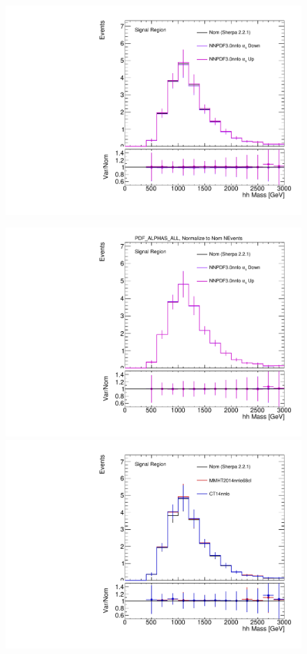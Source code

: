 \begin{figure}[!htbp]
\begin{center}

\includegraphics[scale=0.33]{./figures/boosted/systematics/zjets_alt_hhMass_SR_syst_PDF_ALPHAS_ALL_UnNormalized}
 
\includegraphics[scale=0.33]{./figures/boosted/systematics/zjets_alt_hhMass_SR_syst_PDF_ALPHAS_ALL}
 \\
\includegraphics[scale=0.33]{./figures/boosted/systematics/zjets_alt_hhMass_SR_syst_PDF_ALTSETS_ALL_UnNormalized}


\end{center}
\end{figure}
